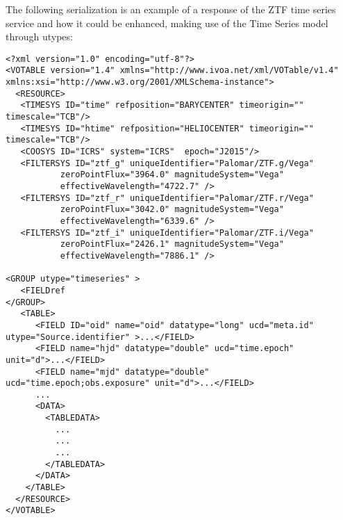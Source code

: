 \documentclass[11pt,a4paper]{ivoa}
\begin{document}
The following serialization is an example of a response of the ZTF time series service and how it could be enhanced, making use of the Time Series model through utypes:
\begin{verbatim}
<?xml version="1.0" encoding="utf-8"?>
<VOTABLE version="1.4" xmlns="http://www.ivoa.net/xml/VOTable/v1.4" 
xmlns:xsi="http://www.w3.org/2001/XMLSchema-instance">
  <RESOURCE>
   <TIMESYS ID="time" refposition="BARYCENTER" timeorigin="" timescale="TCB"/>
   <TIMESYS ID="htime" refposition="HELIOCENTER" timeorigin="" timescale="TCB"/>
   <COOSYS ID="ICRS" system="ICRS"  epoch="J2015"/>
   <FILTERSYS ID="ztf_g" uniqueIdentifier="Palomar/ZTF.g/Vega" 
           zeroPointFlux="3964.0" magnitudeSystem="Vega" 
           effectiveWavelength="4722.7" />
   <FILTERSYS ID="ztf_r" uniqueIdentifier="Palomar/ZTF.r/Vega" 
           zeroPointFlux="3042.0" magnitudeSystem="Vega" 
           effectiveWavelength="6339.6" />
   <FILTERSYS ID="ztf_i" uniqueIdentifier="Palomar/ZTF.i/Vega" 
           zeroPointFlux="2426.1" magnitudeSystem="Vega" 
           effectiveWavelength="7886.1" />

<GROUP utype="timeseries" >
   <FIELDref
</GROUP>
   <TABLE>
      <FIELD ID="oid" name="oid" datatype="long" ucd="meta.id" utype="Source.identifier" >...</FIELD>
      <FIELD name="hjd" datatype="double" ucd="time.epoch" unit="d">...</FIELD>
      <FIELD name="mjd" datatype="double" ucd="time.epoch;obs.exposure" unit="d">...</FIELD>
      ...
      <DATA>
        <TABLEDATA>
          ...
          ...
          ...
        </TABLEDATA>
      </DATA>
    </TABLE>
  </RESOURCE>
</VOTABLE>
\end{verbatim}

\end{document}
